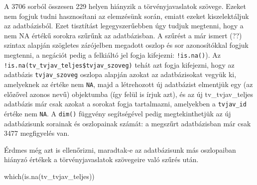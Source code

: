 \documentclass[
]{book}
\newenvironment{Shaded}{\begin{snugshade}}{\end{snugshade}}
\newcommand{\FunctionTok}[1]{\textcolor[rgb]{0.00,0.00,0.00}{#1}}
\newcommand{\NormalTok}[1]{#1}
\newcommand{\OtherTok}[1]{\textcolor[rgb]{0.56,0.35,0.01}{#1}}
\newcommand{\SpecialCharTok}[1]{\textcolor[rgb]{0.00,0.00,0.00}{#1}}
\begin{document}
\begin{Shaded}
\end{Shaded}

A 3706 sorból összesen 229 helyen hiányzik a törvényjavaslatok szövege.
Ezeket nem fogjuk tudni hasznosítani az elemzésünk során, emiatt ezeket
kiszelektáljuk az adatbázisból. Ezet tisztítást legegyszerűebben úgy
tudjuk megtenni, hogy a nem NA értékű sorokra szűrűnk az adatbázisban. A
szűrést a már ismert (??) szintax alapján szögletes zárójelben megadott
oszlop és sor azonosítókkal fogjuk megtenni, a negációt pedig a
felkiáltó jel fogja kifejezni: \texttt{!is.na()}). Az
\texttt{!is.na(tv\_tvjav\_teljes\$tvjav\_szoveg)} tehát azt fogja
kifejezni, hogy az adatbázis \texttt{tvjav\_szoveg} oszlopa alapján
azokat az adatbázisokat vegyük ki, amelyeknek az értéke nem \texttt{NA},
majd a létrehozott új adatbázist elmentjük egy (az előzővel azonos nevű)
objektumba (így felül is írjuk azt), és az új tv\_tvjav\_teljes
adatbázis már csak azokat a sorokat fogja tartalmazni, amelyekben a
\texttt{tvjav\_id} értéke nem \texttt{NA}. A \texttt{dim()} függvény
segítségével pedig megtekinthetjük az új adatbázisunk sorainak és
oszlopainak számát: a megszűrt adatbázisban már csak 3477 megfigyelés
van.

\begin{Shaded}
\end{Shaded}

Érdmes még azt is ellenőrizni, maradtak-e az adatbázisunk más
oszlopaiban hiányzó értékek a törvényjavaslatok szövegeire való szűrés
után.

\begin{Shaded}
\begin{Highlighting}[]
\FunctionTok{which}\NormalTok{(}\FunctionTok{is.na}\NormalTok{(tv\_tvjav\_teljes)) }
\end{Highlighting}
\end{Shaded}
\end{document}
